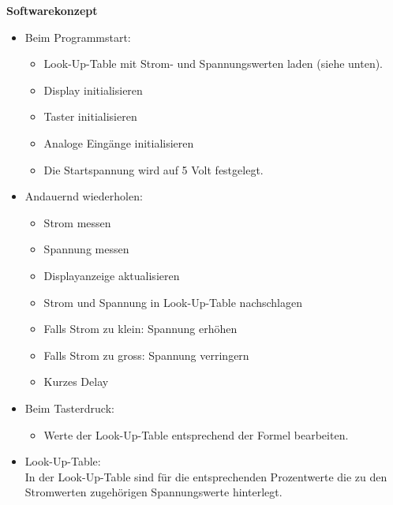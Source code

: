 \documentclass [12pt]{fhnwreport}
\begin{document}
\textbf{Softwarekonzept}
\begin{itemize}
\item Beim Programmstart:
	\begin{itemize}
	\item Look-Up-Table mit Strom- und Spannungswerten laden (siehe unten).
	\item Display initialisieren
	\item Taster initialisieren
	\item Analoge Eingänge initialisieren
	\item Die Startspannung wird auf 5 Volt festgelegt.
	\end{itemize}
\newpage
\item Andauernd wiederholen:
	\begin{itemize}
	\item Strom messen
	\item Spannung messen
	\item Displayanzeige aktualisieren
	\item Strom und Spannung in Look-Up-Table nachschlagen
	\item Falls Strom zu klein: Spannung erhöhen
	\item Falls Strom zu gross: Spannung verringern
	\item Kurzes Delay
	\end{itemize}
	
\item Beim Tasterdruck:
	\begin{itemize}
	\item Werte der Look-Up-Table entsprechend der Formel bearbeiten.
	\end{itemize}
	
\item Look-Up-Table:\\
In der Look-Up-Table sind für die entsprechenden Prozentwerte die zu den Stromwerten zugehörigen Spannungswerte hinterlegt.
\end{itemize}
\end{document}
